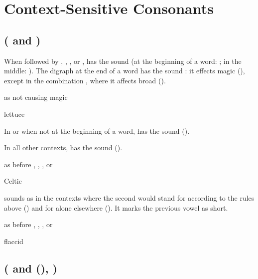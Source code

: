 \section{Context-Sensitive Consonants}

\subsection{ ( and )}

When followed by , , , or ,  has the sound 
(at the beginning of a word: ; in the
middle: ). The digraph  at the end of a
word has the sound : it effects magic  (),
except in the combination , where it affects broad  ().

\begin{exceptions}{ as  not causing magic }
\item lettuce
\end{exceptions}

In  or  when not at the beginning of a word,  has the
sound  ().

In all other contexts,  has the sound  ().

\begin{exceptions}{ as  before , , , or }
\item Celtic
\end{exceptions}

 sounds as  in the contexts where the second  would stand
for  according to the rules above () and for 
alone elsewhere (). It marks the previous vowel as short.

\begin{exceptions}{ as  before , , , or }
\item flaccid
\end{exceptions}

\subsection{ ( and  (), )}

